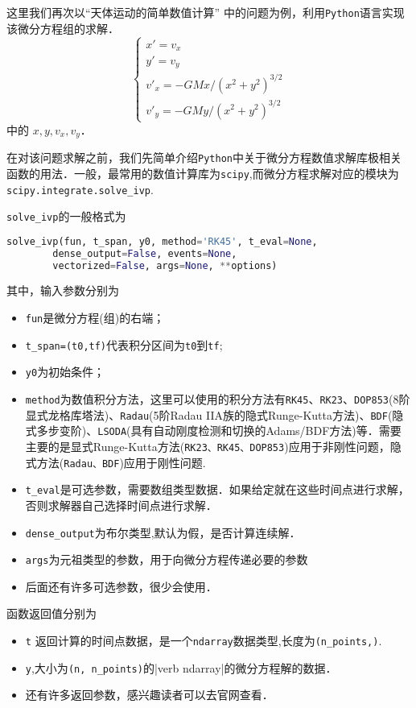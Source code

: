 这里我们再次以“天体运动的简单数值计算” 中的问题为例，利用\verb |Python|语言实现该微分方程组的求解．
\begin{equation}\label{PyIVP_eq}
\begin{cases}
x' = v_x\\
y' = v_y\\
v'_x = -GMx/(x^2 + y^2)^{3/2}\\
v'_y = -GMy/(x^2 + y^2)^{3/2}
\end{cases}
\end{equation}
中的 $x, y, v_x, v_y$．

在对该问题求解之前，我们先简单介绍\verb|Python|中关于微分方程数值求解库极相关函数的用法．一般，最常用的数值计算库为\verb|scipy|,而微分方程求解对应的模块为\verb|scipy.integrate.solve_ivp|.

 \verb|solve_ivp|的一般格式为
 \begin{lstlisting}[language=python]
 solve_ivp(fun, t_span, y0, method='RK45', t_eval=None,
        dense_output=False, events=None, 
        vectorized=False, args=None, **options)
 \end{lstlisting}
 其中，输入参数分别为
\begin{itemize}
\item \verb|fun|是微分方程(组)的右端；
\item  \verb|t_span=(t0,tf)|代表积分区间为\verb|t0|到\verb|tf|;
\item  \verb|y0|为初始条件；
\item \verb|method|为数值积分方法，这里可以使用的积分方法有\verb|RK45|、\verb|RK23|、\verb|DOP853|(8阶显式龙格库塔法)、\verb|Radau|(5阶Radau IIA族的隐式Runge-Kutta方法)、\verb|BDF|(隐式多步变阶)、\verb|LSODA|(具有自动刚度检测和切换的Adams/BDF方法)等．需要主要的是显式Runge-Kutta方法(\verb|RK23、RK45、DOP853|)应用于非刚性问题，隐式方法(\verb|Radau、BDF|)应用于刚性问题.
\item \verb|t_eval|是可选参数，需要数组类型数据．如果给定就在这些时间点进行求解，否则求解器自己选择时间点进行求解．
\item \verb|dense_output|为布尔类型,默认为假，是否计算连续解．
\item \verb|args|为元祖类型的参数，用于向微分方程传递必要的参数
\item 后面还有许多可选参数，很少会使用．
\end{itemize}
函数返回值分别为
\begin{itemize}
\item  \verb|t| 返回计算的时间点数据，是一个\verb|ndarray|数据类型,长度为\verb|(n_points,)|.
\item \verb|y|,大小为\verb|(n, n_points)|的|verb ndarray|的微分方程解的数据．
\item 还有许多返回参数，感兴趣读者可以去官网查看．
\end{itemize}


